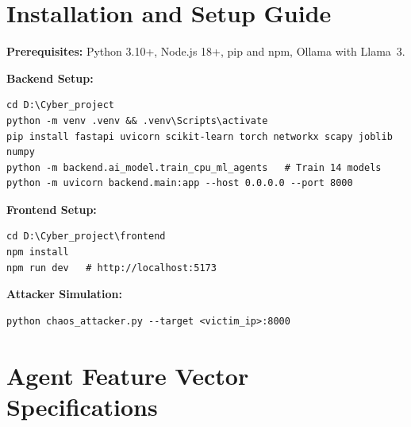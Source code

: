 \documentclass[12pt, a4paper]{report}
\begin{document}
\appendix

\chapter{Installation and Setup Guide}

\textbf{Prerequisites:} Python 3.10+, Node.js 18+, pip and npm, Ollama with Llama~3.

\textbf{Backend Setup:}
\begin{verbatim}
cd D:\Cyber_project
python -m venv .venv && .venv\Scripts\activate
pip install fastapi uvicorn scikit-learn torch networkx scapy joblib numpy
python -m backend.ai_model.train_cpu_ml_agents   # Train 14 models
python -m uvicorn backend.main:app --host 0.0.0.0 --port 8000
\end{verbatim}

\textbf{Frontend Setup:}
\begin{verbatim}
cd D:\Cyber_project\frontend
npm install
npm run dev   # http://localhost:5173
\end{verbatim}

\textbf{Attacker Simulation:}
\begin{verbatim}
python chaos_attacker.py --target <victim_ip>:8000
\end{verbatim}

\chapter{Agent Feature Vector Specifications}
\end{document}
